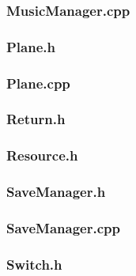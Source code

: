 \documentclass{article}
\begin{document}
\subsubsection{MusicManager.cpp}
	
	 				
\subsubsection{Plane.h}
	
	 				
\subsubsection{Plane.cpp}
	
	 			
\subsubsection{Return.h}
	
	 				
\subsubsection{Resource.h}
	
	 				
\subsubsection{SaveManager.h}
	
	 				
\subsubsection{SaveManager.cpp}
	
	 				
\subsubsection{Switch.h}
	
	 				
\end{document}
